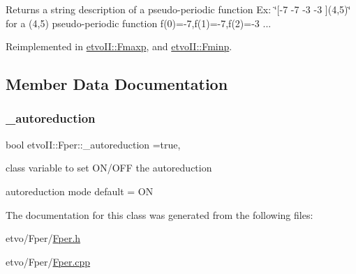 Returns a string description of a pseudo-\/periodic function Ex\+: \char`\"{}\mbox{[}-\/7 -\/7 -\/3 -\/3 \mbox{]}(4,5)\char`\"{} for a (4,5) pseudo-\/periodic function f(0)=-\/7,f(1)=-\/7,f(2)=-\/3 ... 

Reimplemented in \mbox{\hyperlink{classetvo_i_i_1_1_fmaxp_ac9d63f5e1e7eef10af1e3122f5dd4809}{etvo\+I\+I\+::\+Fmaxp}}, and \mbox{\hyperlink{classetvo_i_i_1_1_fminp_a84497665aaf322cf0606257ca543108e}{etvo\+I\+I\+::\+Fminp}}.



\subsection{Member Data Documentation}
\mbox{\label{classetvo_i_i_1_1_fper_ada0cc8d2afca070616aed2a397e6ccc3}} 
\subsubsection{\texorpdfstring{\+\_\+autoreduction}{\_autoreduction}}
{\footnotesize\ttfamily bool etvo\+I\+I\+::\+Fper\+::\+\_\+autoreduction =true\hspace{0.3cm}{\ttfamily [static]}, {\ttfamily [protected]}}



class variable to set O\+N/\+O\+FF the autoreduction 

autoreduction mode default = ON 

The documentation for this class was generated from the following files\+:\begin{DoxyCompactItemize}
\item 
etvo/\+Fper/\mbox{\hyperlink{_fper_8h}{Fper.\+h}}\item 
etvo/\+Fper/\mbox{\hyperlink{_fper_8cpp}{Fper.\+cpp}}\end{DoxyCompactItemize}
